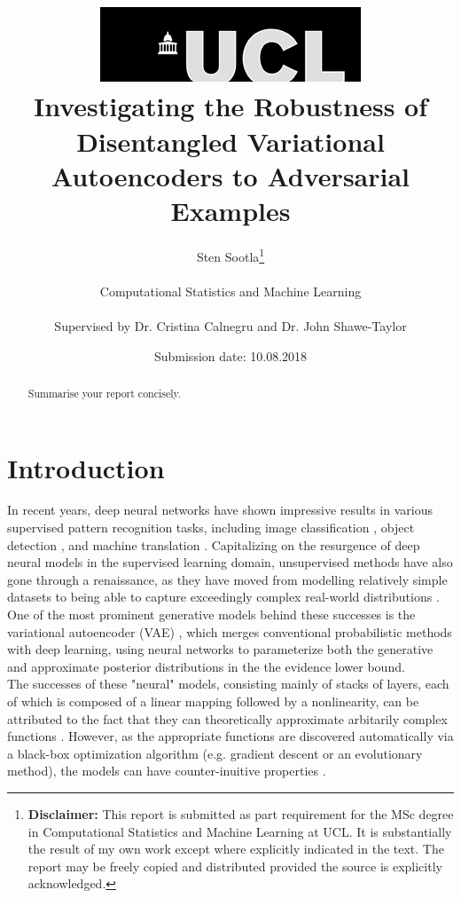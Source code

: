 \documentclass{report}
\title{{ \includegraphics[scale=.5,natwidth=294,natheight=84]{ucl_logo}}\\
{{\Huge Investigating the Robustness of Disentangled Variational Autoencoders to Adversarial Examples}}\\}
\date{Submission date: 10.08.2018}
\author{Sten Sootla\thanks{
{\bf Disclaimer:}
This report is submitted as part requirement for the MSc degree in Computational Statistics and Machine Learning at UCL. It is substantially the result of my own work except where explicitly indicated in the text. The report may be freely copied and distributed provided the source is explicitly acknowledged.}
\\ \\
Computational Statistics and Machine Learning\\ \\
Supervised by Dr. Cristina Calnegru and Dr. John Shawe-Taylor
}
\begin{document}
 
\onehalfspacing
\maketitle
\begin{abstract}
Summarise your report concisely.
\end{abstract}
\tableofcontents
\setcounter{page}{1}


\chapter{Introduction}



\noindent In recent years, deep neural networks have shown impressive results in various supervised pattern recognition tasks, including image classification \cite{alexnet, resnet}, object detection \cite{rcnn}, and machine translation \cite{nmt}. Capitalizing on the resurgence of deep neural models in the supervised learning domain, unsupervised methods have also gone through a renaissance, as they have moved from modelling relatively simple datasets \cite{rbm, helmholtz} to being able to capture exceedingly complex real-world distributions \cite{began, musicvae}. One of the most prominent generative models behind these successes is the variational autoencoder (VAE) \cite{vae}, which merges conventional probabilistic methods with deep learning, using neural networks to parameterize both the generative and approximate posterior distributions in the the evidence lower bound. \\

\noindent The successes of these "neural" models, consisting mainly of stacks of layers, each of which is composed of a linear mapping followed by a nonlinearity, can be attributed to the fact that they can theoretically approximate arbitarily complex functions \cite{Cybenko1989}. However, as the appropriate functions are discovered automatically via a black-box optimization algorithm (e.g. gradient descent or an evolutionary method), the models can have counter-inuitive properties \cite{intriguing-properties}. \\
\end{document}
